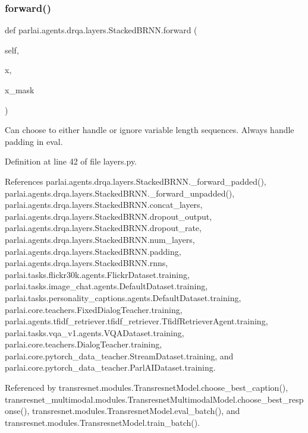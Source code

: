 \subsubsection{\texorpdfstring{forward()}{forward()}}
{\footnotesize\ttfamily def parlai.\+agents.\+drqa.\+layers.\+Stacked\+B\+R\+N\+N.\+forward (\begin{DoxyParamCaption}\item[{}]{self,  }\item[{}]{x,  }\item[{}]{x\+\_\+mask }\end{DoxyParamCaption})}

\begin{DoxyVerb}Can choose to either handle or ignore variable length sequences.
Always handle padding in eval.
\end{DoxyVerb}
 

Definition at line 42 of file layers.\+py.



References parlai.\+agents.\+drqa.\+layers.\+Stacked\+B\+R\+N\+N.\+\_\+forward\+\_\+padded(), parlai.\+agents.\+drqa.\+layers.\+Stacked\+B\+R\+N\+N.\+\_\+forward\+\_\+unpadded(), parlai.\+agents.\+drqa.\+layers.\+Stacked\+B\+R\+N\+N.\+concat\+\_\+layers, parlai.\+agents.\+drqa.\+layers.\+Stacked\+B\+R\+N\+N.\+dropout\+\_\+output, parlai.\+agents.\+drqa.\+layers.\+Stacked\+B\+R\+N\+N.\+dropout\+\_\+rate, parlai.\+agents.\+drqa.\+layers.\+Stacked\+B\+R\+N\+N.\+num\+\_\+layers, parlai.\+agents.\+drqa.\+layers.\+Stacked\+B\+R\+N\+N.\+padding, parlai.\+agents.\+drqa.\+layers.\+Stacked\+B\+R\+N\+N.\+rnns, parlai.\+tasks.\+flickr30k.\+agents.\+Flickr\+Dataset.\+training, parlai.\+tasks.\+image\+\_\+chat.\+agents.\+Default\+Dataset.\+training, parlai.\+tasks.\+personality\+\_\+captions.\+agents.\+Default\+Dataset.\+training, parlai.\+core.\+teachers.\+Fixed\+Dialog\+Teacher.\+training, parlai.\+agents.\+tfidf\+\_\+retriever.\+tfidf\+\_\+retriever.\+Tfidf\+Retriever\+Agent.\+training, parlai.\+tasks.\+vqa\+\_\+v1.\+agents.\+V\+Q\+A\+Dataset.\+training, parlai.\+core.\+teachers.\+Dialog\+Teacher.\+training, parlai.\+core.\+pytorch\+\_\+data\+\_\+teacher.\+Stream\+Dataset.\+training, and parlai.\+core.\+pytorch\+\_\+data\+\_\+teacher.\+Parl\+A\+I\+Dataset.\+training.



Referenced by transresnet.\+modules.\+Transresnet\+Model.\+choose\+\_\+best\+\_\+caption(), transresnet\+\_\+multimodal.\+modules.\+Transresnet\+Multimodal\+Model.\+choose\+\_\+best\+\_\+response(), transresnet.\+modules.\+Transresnet\+Model.\+eval\+\_\+batch(), and transresnet.\+modules.\+Transresnet\+Model.\+train\+\_\+batch().

